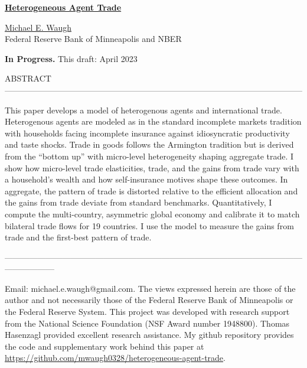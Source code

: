 \documentclass[12pt,pdftex]{article}
\begin{document}
\begin{onehalfspacing}

{\large \textbf{\href{https://www.waugheconomics.com/uploads/2/2/5/6/22563786/heterogeneous-agent-trade.pdf}{Heterogeneous Agent Trade}}}

\vspace{0.5cm}

\href{http://www.waugheconomics.com/}{Michael E. Waugh} \\ Federal Reserve Bank of Minneapolis and NBER

\vspace{0.5cm}

\textbf{In Progress.} This draft: April 2023

\vspace{1.5cm}


\normalsize

ABSTRACT ------------------------------------------------------------------------------------------------------------

This paper develops a model of heterogenous agents and international trade. Heterogenous agents are modeled as in the standard incomplete markets tradition with households facing incomplete insurance against idiosyncratic productivity and taste shocks. Trade in goods follows the Armington tradition but is derived from the ``bottom up'' with micro-level heterogeneity shaping aggregate trade. I show how micro-level trade elasticities, trade, and the gains from trade vary with a household's wealth and how self-insurance motives shape these outcomes. In aggregate, the pattern of trade is distorted relative to the efficient allocation and the gains from trade deviate from standard benchmarks. Quantitatively, I compute the multi-country, asymmetric global economy and calibrate it to match bilateral trade flows for 19 countries. I use the model to measure the gains from trade and the first-best pattern of trade.

------------------------------------------------------------------------------------------------------------------------------
%

\vspace{6.0cm}

\footnotesize Email: michael.e.waugh@gmail.com. The views expressed herein are those of the author and not necessarily those of the Federal Reserve Bank of Minneapolis or the Federal Reserve System. This project was developed with research support from the National Science Foundation (NSF Award number 1948800). Thomas Hasenzagl provided excellent research assistance. My github repository provides the code and supplementary work behind this paper at \url{https://github.com/mwaugh0328/heterogeneous-agent-trade}.


\end{onehalfspacing}
\end{document}
